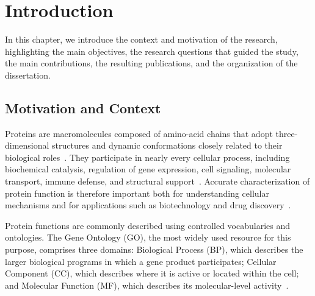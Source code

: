 \documentclass[Ingles]{ic-tese-v3}
\begin{document}


\listoffigures

\listoftables






\tableofcontents


\fimdaspaginasiniciais


\chapter{Introduction}
\label{cap:introducao}

In this chapter, we introduce the context and motivation of the research, highlighting the main objectives, the research questions that guided the study, the main contributions, the resulting publications, and the organization of the dissertation.

\section{Motivation and Context}

Proteins are macromolecules composed of amino-acid chains that adopt three-dimensional structures and dynamic conformations closely related to their biological roles~\cite{satyanarayana2013biochemistry, anfinsen_dogma}. They participate in nearly every cellular process, including biochemical catalysis, regulation of gene expression, cell signaling, molecular transport, immune defense, and structural support~\cite{satyanarayana2013biochemistry}. Accurate characterization of protein function is therefore important both for understanding cellular mechanisms and for applications such as biotechnology and drug discovery~\cite{boadu2025deep, lin2024comprehensive}.

Protein functions are commonly described using controlled vocabularies and ontologies. The Gene Ontology (GO), the most widely used resource for this purpose, comprises three domains: Biological Process (BP), which describes the larger biological programs in which a gene product participates; Cellular Component (CC), which describes where it is active or located within the cell; and Molecular Function (MF), which describes its molecular-level activity~\cite{ashburner_gene_2000}.
\end{document}

